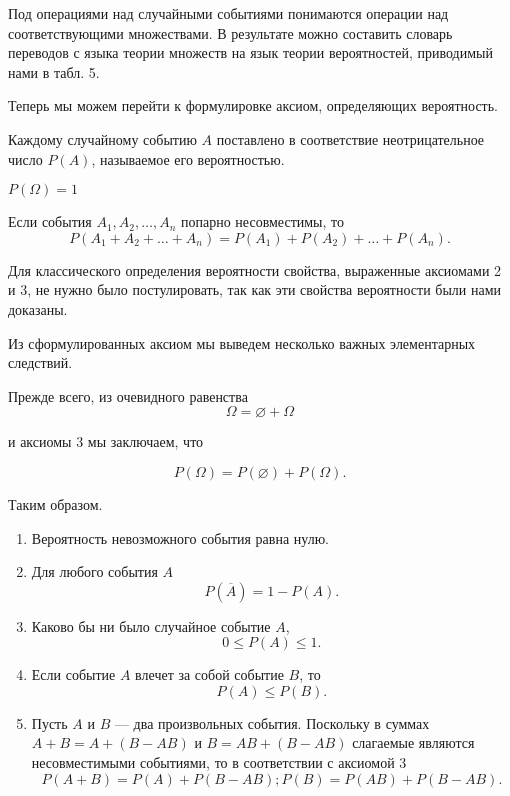Под операциями над случайными событиями понимаются операции над соответствующими множествами. В результате можно составить словарь переводов с языка теории множеств на язык теории вероятностей, приводимый нами в табл. 5.

Теперь мы можем перейти к формулировке аксиом, определяющих вероятность.
\begin{axiome} 
Каждому случайному событию $A$ поставлено в соответствие неотрицательное число $P(A)$, называемое его вероятностью.
\end{axiome}
\begin{axiome} 
$P(\Omega) = 1$
\end{axiome}
\begin{axiome} 
Если события $A_1,A_2, \ldots, A_n$ попарно несовместимы, то 
$$
P(A_1 + A_2 + \ldots + A_n) = P(A_1) + P(A_2) + \ldots + P(A_n).
$$
\end{axiome}
Для классического определения вероятности свойства, выраженные аксиомами 2 и 3, не нужно было постулировать, так как эти свойства вероятности были нами доказаны.

Из сформулированных аксиом мы выведем несколько важных элементарных следствий.

Прежде всего, из очевидного равенства
$$
\Omega = \varnothing + \Omega
$$

и аксиомы 3 мы заключаем, что

$$
P(\Omega) = P(\varnothing) + P(\Omega).
$$

Таким образом.
\begin{enumerate}
\item
Вероятность невозможного события равна нулю.
\item	
Для любого события $A$
$$
P(\overline{A}) = 1 - P(A).
$$
\item
Каково бы ни было случайное событие $A$,
$$
0 \le P(A) \le 1.
$$
\item
Если событие $A$ влечет за собой событие $B$, то
$$
P(A) \le P(B).
$$
\item
Пусть $A$ и $B$ --- два произвольных события. Поскольку в суммах $A + B = A + (B - AB)$ и $B = AB + (B - AB)$ слагаемые являются несовместимыми событиями, то в соответствии с аксиомой 3
$$
P(A + B) = P(A) + P(B - AB); P(B) = P(AB) + P(B - AB).
$$
\end{enumerate}

